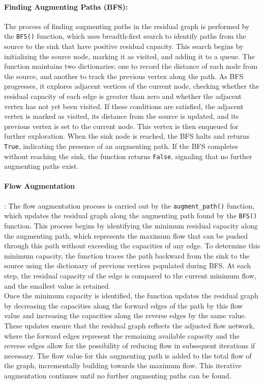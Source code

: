 \paragraph{Finding Augmenting Paths (BFS):} The process of finding augmenting paths in the residual graph is performed by the \texttt{BFS()} function, which uses breadth-first search to identify paths from the source to the sink that have positive residual capacity. This search begins by initializing the source node, marking it as visited, and adding it to a queue. The function maintains two dictionaries: one to record the distance of each node from the source, and another to track the previous vertex along the path. As BFS progresses, it explores adjacent vertices of the current node, checking whether the residual capacity of each edge is greater than zero and whether the adjacent vertex has not yet been visited. If these conditions are satisfied, the adjacent vertex is marked as visited, its distance from the source is updated, and its previous vertex is set to the current node. This vertex is then enqueued for further exploration. When the sink node is reached, the BFS halts and returns \texttt{True}, indicating the presence of an augmenting path. If the BFS completes without reaching the sink, the function returns \texttt{False}, signaling that no further augmenting paths exist. 

\paragraph{Flow Augmentation}: The flow augmentation process is carried out by the \texttt{augment\_path()} function, which updates the residual graph along the augmenting path found by the \texttt{BFS()} function. This process begins by identifying the minimum residual capacity along the augmenting path, which represents the maximum flow that can be pushed through this path without exceeding the capacities of any edge. To determine this minimum capacity, the function traces the path backward from the sink to the source using the dictionary of previous vertices populated during BFS. At each step, the residual capacity of the edge is compared to the current minimum flow, and the smallest value is retained. \\
Once the minimum capacity is identified, the function updates the residual graph by decreasing the capacities along the forward edges of the path by this flow value and increasing the capacities along the reverse edges by the same value. These updates ensure that the residual graph reflects the adjusted flow network, where the forward edges represent the remaining available capacity and the reverse edges allow for the possibility of reducing flow in subsequent iterations if necessary. The flow value for this augmenting path is added to the total flow of the graph, incrementally building towards the maximum flow. This iterative augmentation continues until no further augmenting paths can be found. 

